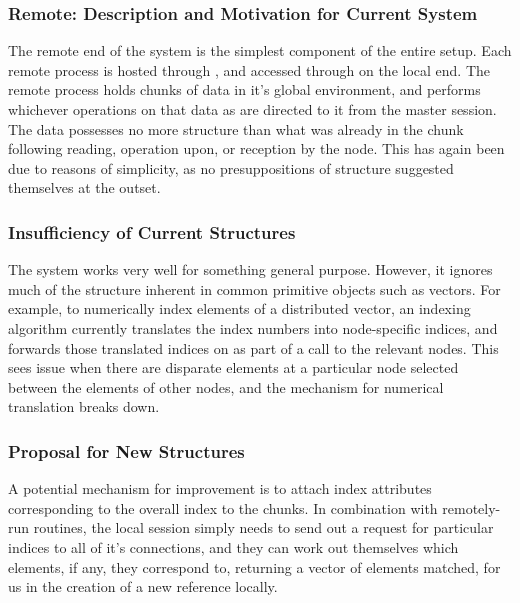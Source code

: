 \subsubsection{Remote: Description and Motivation for Current System}\label{description-and-motivation-for-current-system}

The remote end of the system is the simplest component of the entire
setup. Each remote \R process is hosted through
, and accessed through  on the local
end. The remote \R process holds chunks of data in it's global
environment, and performs whichever operations on that data as are
directed to it from the master \R session. The data possesses no more
structure than what was already in the chunk following reading,
operation upon, or reception by the node. This has again been due to
reasons of simplicity, as no presuppositions of structure suggested
themselves at the outset.

\subsubsection{Insufficiency of Current Structures}\label{insufficiency-of-current-structures-1}

The system works very well for something general purpose. However, it
ignores much of the structure inherent in common primitive \R objects
such as vectors. For example, to numerically index elements of a
distributed vector, an indexing algorithm currently translates the index
numbers into node-specific indices, and forwards those translated
indices on as part of a call to the relevant nodes. This sees issue when
there are disparate elements at a particular node selected between the
elements of other nodes, and the mechanism for numerical translation
breaks down.

\subsubsection{Proposal for New Structures}\label{proposal-for-new-structures}

A potential mechanism for improvement is to attach index attributes
corresponding to the overall index to the chunks. In combination with
remotely-run routines, the local session simply needs to send out a
request for particular indices to all of it's connections, and they can
work out themselves which elements, if any, they correspond to,
returning a vector of elements matched, for us in the creation of a new
reference locally.

